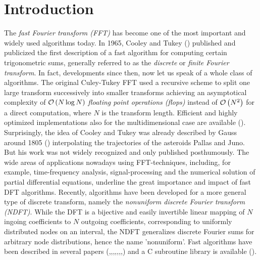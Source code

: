 
\chapter*{Introduction}
\label{Introduction}

The \emph{fast Fourier transform (FFT)} has become one of the most important 
and widely used algorithms today. In 1965, Cooley and Tukey (\cite{cotu}) published
and publicized the first description of a fast algorithm for computing certain
trigonometric sums, generally referred to as the \emph{discrete} or 
\emph{finite Fourier transform}. In fact, developments since then, now
let us speak of a whole class of algorithms. The original Culey-Tukey FFT
used a recursive scheme to split one large transform successively into
smaller transforms achieving an asymptotical complexity of 
$\mathcal{O}\left(N \log N\right)$ \emph{floating point operations (flops)} instead of
$\mathcal{O}\left(N^2\right)$ for a direct computation, where $N$ is the transform length. 
Efficient and highly optimized implementations also for the
multidimensional case are available (\cite{fftw}).
Surprisingly, the idea of Cooley and Tukey was already described by Gauss around
1805 (\cite{hejobu}) interpolating the trajectories of the asteroids Pallas 
and Juno. But his work was not widely recognized and only published posthumously.
The wide areas of applications nowadays using FFT-techniques, including, for example, 
time-frequency analysis, signal-processing and the numerical solution of 
partial differential equations, underline the great importance and impact of fast
DFT algorithms.
Recently, algorithms have been developed for a more general type of discrete 
transform, namely the \emph{nonuniform discrete Fourier transform (NDFT)}. 
While the DFT is a bijective and easily invertible linear mapping of $N$ 
ingoing coefficients to $N$ outgoing coefficients, corresponding to
uniformly distributed nodes on an interval, the NDFT generalizes
discrete Fourier sums for arbitrary node distributions, hence the name
'nonuniform'. Fast algorithms have been described in several papers 
(\cite{bey95},\cite{duro93},\cite{fesu02},\cite{four},\cite{Ja},\cite{Pe},\cite{scsc},\cite{ware98}) and a C subroutine library is available 
(\cite{kupo02C}).
